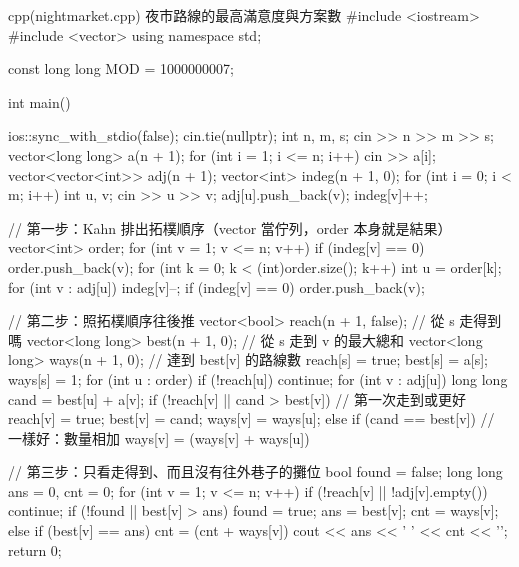 \begin{example}[label=ex:nightmarket]{cpp}{(nightmarket.cpp) 夜市路線的最高滿意度與方案數}
#include <iostream>
#include <vector>
using namespace std;

const long long MOD = 1000000007;

int main() {
    ios::sync_with_stdio(false);
    cin.tie(nullptr);
    int n, m, s;
    cin >> n >> m >> s;
    vector<long long> a(n + 1);
    for (int i = 1; i <= n; i++) {
        cin >> a[i];
    }
    vector<vector<int>> adj(n + 1);
    vector<int> indeg(n + 1, 0);
    for (int i = 0; i < m; i++) {
        int u, v;
        cin >> u >> v;
        adj[u].push_back(v);
        indeg[v]++;
    }

    // 第一步：Kahn 排出拓樸順序（vector 當佇列，order 本身就是結果）
    vector<int> order;
    for (int v = 1; v <= n; v++) {
        if (indeg[v] == 0) {
            order.push_back(v);
        }
    }
    for (int k = 0; k < (int)order.size(); k++) {
        int u = order[k];
        for (int v : adj[u]) {
            indeg[v]--;
            if (indeg[v] == 0) {
                order.push_back(v);
            }
        }
    }

    // 第二步：照拓樸順序往後推
    vector<bool> reach(n + 1, false);   // 從 s 走得到嗎
    vector<long long> best(n + 1, 0);   // 從 s 走到 v 的最大總和
    vector<long long> ways(n + 1, 0);   // 達到 best[v] 的路線數
    reach[s] = true;
    best[s] = a[s];
    ways[s] = 1;
    for (int u : order) {
        if (!reach[u]) {
            continue;
        }
        for (int v : adj[u]) {
            long long cand = best[u] + a[v];
            if (!reach[v] || cand > best[v]) {  // 第一次走到或更好
                reach[v] = true;
                best[v] = cand;
                ways[v] = ways[u];
            } else if (cand == best[v]) {       // 一樣好：數量相加
                ways[v] = (ways[v] + ways[u]) %
            }
        }
    }

    // 第三步：只看走得到、而且沒有往外巷子的攤位
    bool found = false;
    long long ans = 0, cnt = 0;
    for (int v = 1; v <= n; v++) {
        if (!reach[v] || !adj[v].empty()) {
            continue;
        }
        if (!found || best[v] > ans) {
            found = true;
            ans = best[v];
            cnt = ways[v];
        } else if (best[v] == ans) {
            cnt = (cnt + ways[v]) %
        }
    }
    cout << ans << ' ' << cnt << '\n';
    return 0;
}
\end{example}

